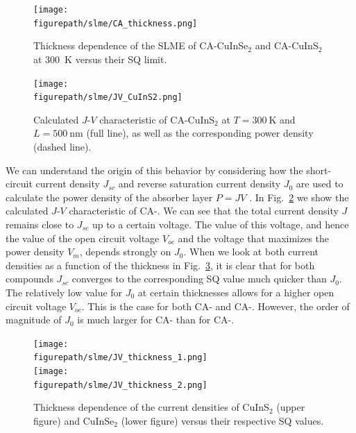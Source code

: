 \begin{refsection}
\begin{figure}[ht] 
\centering 
\texttt{[image: \\figurepath/slme/CA\_thickness.png]} 
\caption{Thickness dependence of the SLME of CA-CuInSe$_2$ and CA-CuInS$_2$ 
at 300~\si{\kelvin} versus their SQ limit.} 
\label{slme:fig-SLME_L} 
\end{figure} 
 
\begin{figure}[ht] 
	\centering 
		\texttt{[image: \\figurepath/slme/JV\_CuInS2.png]} 
	\caption{Calculated $J$-$V$ characteristic of CA-CuInS$_2$ at 
$T=300~\si{\kelvin}$ and $L = 500~\si{\nano\meter}$ (full line), as well as 
the corresponding power density (dashed line).} 
	\label{slme:fig-CuInS2_JV} 
\end{figure}

We can understand the origin of this behavior by considering how the 
short-circuit current density $J_{sc}$ and reverse saturation current density 
$J_0$ are used to calculate the power density of the absorber layer $P = JV$ . 
In Fig.~\ref{slme:fig-CuInS2_JV} we show the calculated \mbox{$J$-$V$} 
characteristic of \mbox{CA-}. We can see that the total current 
density $J$ remains close to $J_{sc}$ up to a certain voltage. The value of 
this voltage, and hence the value of the open circuit voltage $V_{oc}$ and the 
voltage that maximizes the power density $V_{m}$, depends strongly on $J_0$. 
When we look at both current densities as a function of the thickness in 
Fig.~\ref{slme:fig-J_L}, it is clear that for both compounds $J_{sc}$ 
converges to the corresponding SQ value much quicker than $J_0$. The 
relatively low value for $J_0$ at certain thicknesses allows for a higher open 
circuit voltage $V_{oc}$. This is the case for both \mbox{CA-} and 
\mbox{CA-}. However, the order of magnitude of $J_0$ is much 
larger for CA- than for \mbox{CA-}. 

\begin{figure}[ht] 
	\centering 
	\texttt{[image: \\figurepath/slme/JV\_thickness\_1.png]} \\\vspace{-0.5em}
	\texttt{[image: \\figurepath/slme/JV\_thickness\_2.png]}	 
	\caption{Thickness dependence of the current densities of CuInS$_2$ (upper 
figure) and CuInSe$_2$ (lower figure) versus their respective SQ values.} 
	\label{slme:fig-J_L} 
\end{figure} 
 

\end{refsection}
